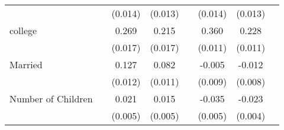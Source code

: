 \begin{longtable}{l*{3}{c}|l*{3}{c}}
	&                     &     (0.014)         &     (0.013)         &                     &     (0.014)         &     (0.013)         \\
	college             &                     &       0.269\sym{***}&       0.215\sym{***}&                     &       0.360\sym{***}&       0.228\sym{***}\\
	&                     &     (0.017)         &     (0.017)         &                     &     (0.011)         &     (0.011)         \\
	Married             &                     &       0.127\sym{***}&       0.082\sym{***}&                     &      -0.005         &      -0.012         \\
	&                     &     (0.012)         &     (0.011)         &                     &     (0.009)         &     (0.008)         \\
	Number of Children  &                     &       0.021\sym{***}&       0.015\sym{***}&                     &      -0.035\sym{***}&      -0.023\sym{***}\\
	&                     &     (0.005)         &     (0.005)         &                     &     (0.005)         &     (0.004)         \\


\end{longtable}
